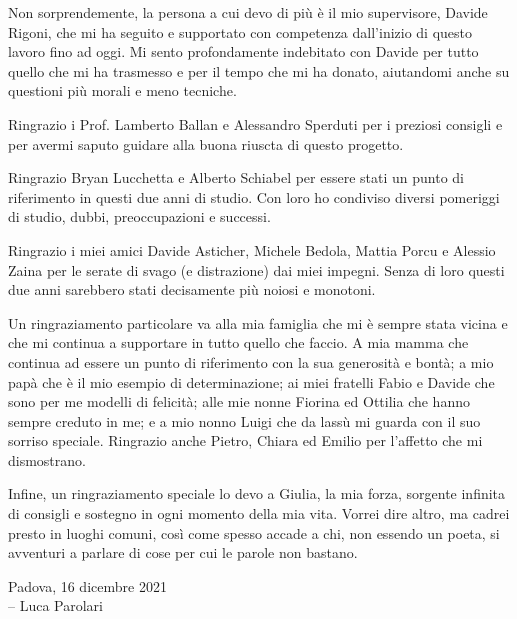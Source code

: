 
Non sorprendemente, la persona a cui devo di più è il mio supervisore,
Davide Rigoni, che mi ha seguito e supportato con competenza
dall'inizio di questo lavoro fino ad oggi. Mi sento profondamente
indebitato con Davide per tutto quello che mi ha trasmesso e per il
tempo che mi ha donato, aiutandomi anche su questioni più morali e
meno tecniche.

\vspace{0.2cm}

Ringrazio i Prof. Lamberto Ballan e Alessandro Sperduti per i preziosi
consigli e per avermi saputo guidare alla buona riuscta di questo
progetto.

\vspace{0.2cm}

Ringrazio Bryan Lucchetta e Alberto Schiabel per essere stati un punto
di riferimento in questi due anni di studio. Con loro ho condiviso
diversi pomeriggi di studio, dubbi, preoccupazioni e successi.

\vspace{0.2cm}

Ringrazio i miei amici Davide Asticher, Michele Bedola, Mattia Porcu e
Alessio Zaina per le serate di svago (e distrazione) dai miei impegni.
Senza di loro questi due anni sarebbero stati decisamente più noiosi e
monotoni.

\vspace{0.2cm}

Un ringraziamento particolare va alla mia famiglia che mi è sempre
stata vicina e che mi continua a supportare in tutto quello che
faccio. A mia mamma che continua ad essere un punto di riferimento con
la sua generosità e bontà; a mio papà che è il mio esempio di
determinazione; ai miei fratelli Fabio e Davide che sono per me
modelli di felicità; alle mie nonne Fiorina ed Ottilia che hanno
sempre creduto in me; e a mio nonno Luigi che da lassù mi guarda con
il suo sorriso speciale. Ringrazio anche Pietro, Chiara ed Emilio per
l'affetto che mi dismostrano.

\vspace{0.2cm}

Infine, un ringraziamento speciale lo devo a Giulia, la mia forza,
sorgente infinita di consigli e sostegno in ogni momento della mia
vita. Vorrei dire altro, ma cadrei presto in luoghi comuni, così come
spesso accade a chi, non essendo un poeta, si avventuri a parlare di
cose per cui le parole non bastano.

\vspace{1cm}

\begin{flushright}
  Padova, 16 dicembre 2021 \\
  -- Luca Parolari
\end{flushright}
